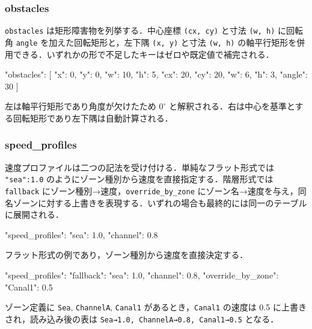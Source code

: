 \documentclass[10pt,letterpaper]{jsarticle}
\begin{document}
\subsubsection{obstacles}
\texttt{obstacles} は矩形障害物を列挙する．中心座標 \texttt{(cx, cy)} と寸法 \texttt{(w, h)} に回転角 \texttt{angle} を加えた回転矩形と，左下隅 \texttt{(x, y)} と寸法 \texttt{(w, h)} の軸平行矩形を併用できる．いずれかの形で不足したキーはゼロや既定値で補完される．
\begin{jsoncode}
"obstacles": [
  {"x": 0, "y": 0, "w": 10, "h": 5},
  {"cx": 20, "cy": 20, "w": 6, "h": 3, "angle": 30}
]
\end{jsoncode}
左は軸平行矩形であり角度が欠けたため $0^\circ$ と解釈される．右は中心を基準とする回転矩形であり左下隅は自動計算される．

\subsubsection{speed\_profiles}
速度プロファイルは二つの記法を受け付ける．単純なフラット形式では \texttt{"sea":1.0} のようにゾーン種別から速度を直接指定する．階層形式では \texttt{fallback} にゾーン種別→速度，\texttt{override\_by\_zone} にゾーン名→速度を与え，同名ゾーンに対する上書きを表現する．いずれの場合も最終的には同一のテーブルに展開される．
\begin{jsoncode}
"speed_profiles": {
  "sea": 1.0,
  "channel": 0.8
}
\end{jsoncode}
フラット形式の例であり，ゾーン種別から速度を直接決定する．

\begin{jsoncode}
"speed_profiles": {
  "fallback": {"sea": 1.0, "channel": 0.8},
  "override_by_zone": {"Canal1": 0.5}
}
\end{jsoncode}
ゾーン定義に \texttt{Sea}, \texttt{ChannelA}, \texttt{Canal1} があるとき，\texttt{Canal1} の速度は 0.5 に上書きされ，読み込み後の表は \texttt{Sea→1.0, ChannelA→0.8, Canal1→0.5} となる．
\end{document}

